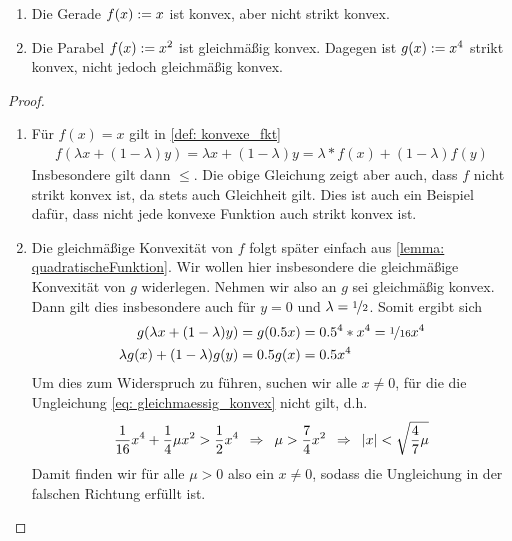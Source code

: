 \documentclass[ %
ngerman, %
a4paper, 
12pt,%
sectionreset, %
chapterstyle=framed, %
sectionstyle=pure, %
titlefont=osfamily %
]{../texmf/tex/latex/mathscriptMathTUD/mathscriptMathTUD}
\begin{document}

\begin{beispiel}
   	\begin{enumerate}[leftmargin=*, nolistsep, label=(\roman*)]
   		\item Die Gerade $f(x) \mathrel{:=} x$ ist konvex, aber nicht strikt konvex.
   		\item Die Parabel $f(x) \mathrel{:=} x^2$ ist gleichmäßig konvex. Dagegen ist $g(x) \mathrel{:=} x^4$ strikt konvex, nicht jedoch gleichmäßig konvex. 
   	\end{enumerate}
\end{beispiel}
\begin{proof}
	\begin{enumerate}[leftmargin=*, nolistsep, label=(\roman*)]
		\item Für $f(x) = x$ gilt in \eqref{def: konvexe_fkt}
		\begin{align*}
			f(\lambda x + (1-\lambda)y) = \lambda x + (1-\lambda) y = \lambda * f(x) + (1-\lambda) f(y)
		\end{align*}
		Insbesondere gilt dann $\leq$. Die obige Gleichung zeigt aber auch, dass $f$ nicht strikt konvex ist, da stets auch Gleichheit gilt. Dies ist auch ein Beispiel dafür, dass nicht jede konvexe Funktion auch strikt konvex ist. 
		\item Die gleichmäßige Konvexität von $f$ folgt später einfach aus \cref{lemma: quadratischeFunktion}. Wir wollen hier insbesondere die gleichmäßige Konvexität von $g$ widerlegen. Nehmen wir also an $g$ sei gleichmäßig konvex. Dann gilt dies insbesondere auch für $y=0$ und $\lambda = \lfrac{1}{2}$. Somit ergibt sich
		\begin{align*}
			g( \lambda x + (1-\lambda) y ) &= g(0.5 x) = 0.5^4 * x^4 = \lfrac{1}{16} x^4 \\
			\lambda g(x) + (1-\lambda) g(y) &= 0.5 g(x) = 0.5 x^4
		\end{align*}
		Um dies zum Widerspruch zu führen, suchen wir alle $x \neq 0$, für die die Ungleichung \eqref{eq: gleichmaessig_konvex} nicht gilt, d.h.
		\begin{align*}
			\frac{1}{16}x^4 + \frac{1}{4} \mu x^2 > \frac{1}{2} x^4 \enskip \Rightarrow \enskip \mu > \frac{7}{4}x^2 \enskip \Rightarrow \enskip \left| x \right| < \sqrt{\frac{4}{7} \mu}
		\end{align*}
		Damit finden wir für alle $\mu > 0$ also ein $x \neq 0$, sodass die Ungleichung in der falschen Richtung erfüllt ist.
	\end{enumerate}
\end{proof}
\end{document}
